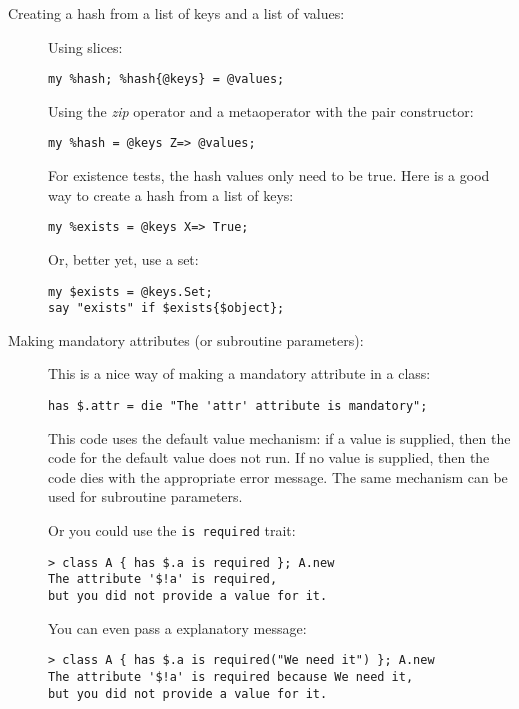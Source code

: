 \begin{description}
\item[Creating a hash from a list of keys and a list of values:] Using slices:

\begin{verbatim}
my %hash; %hash{@keys} = @values;
\end{verbatim}

Using the \emph{zip} operator and a metaoperator with the pair constructor:

\begin{verbatim}
my %hash = @keys Z=> @values;
\end{verbatim}

For existence tests, the hash values only need to be true. Here is 
a good way to create a hash from a list of keys:
\begin{verbatim}
my %exists = @keys X=> True;
\end{verbatim}

Or, better yet, use a set:
\begin{verbatim}
my $exists = @keys.Set;
say "exists" if $exists{$object};
\end{verbatim}

\item[Making mandatory attributes (or subroutine parameters):] 
This is a nice way of making a mandatory attribute in a class:
\begin{verbatim}
has $.attr = die "The 'attr' attribute is mandatory";
\end{verbatim}
This code uses the default value mechanism: if a value is supplied, 
then the code for the default value does not run. If no value is 
supplied, then the code dies with the appropriate error message. 
The same mechanism can be used for subroutine parameters.

Or you could use the \verb'is required' trait:

\begin{verbatim}
> class A { has $.a is required }; A.new
The attribute '$!a' is required, 
but you did not provide a value for it.
\end{verbatim}

You can even pass a explanatory message:

\begin{verbatim}
> class A { has $.a is required("We need it") }; A.new
The attribute '$!a' is required because We need it,
but you did not provide a value for it.
\end{verbatim}


\end{description}
